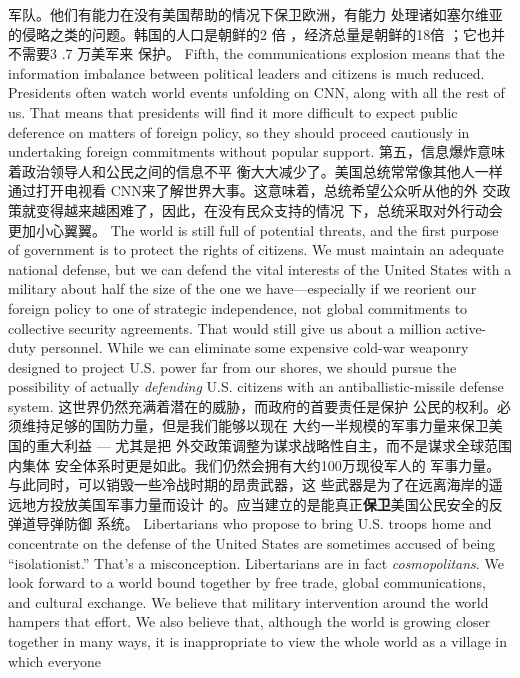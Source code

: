 \begin{paracol}{2}
军队。他们有能力在没有美国帮助的情况下保卫欧洲，有能力
处理诸如塞尔维亚的侵略之类的问题。韩国的人口是朝鲜的2
倍 ，经济总量是朝鲜的18倍 ；它也并不需要3 .7 万美军来
保护。
\switchcolumn*
Fifth, the communications explosion means that the information imbalance between political leaders and citizens is much
reduced. Presidents often watch world events unfolding on
CNN, along with all the rest of us. That means that presidents
will find it more difficult to expect public deference on matters of foreign policy, so they should proceed cautiously in undertaking foreign commitments without popular support.
\switchcolumn
第五，信息爆炸意味着政治领导人和公民之间的信息不平
衡大大减少了。美国总统常常像其他人一样通过打开电视看
CNN来了解世界大事。这意味着，总统希望公众听从他的外
交政策就变得越来越困难了，因此，在没有民众支持的情况
下，总统采取对外行动会更加小心翼翼。
\switchcolumn*
The world is still full of potential threats, and the first purpose of government is to protect the rights of citizens. We must
maintain an adequate national defense, but we can defend the
vital interests of the United States with a military about half the
size of the one we have---especially if we reorient our foreign
policy to one of strategic independence, not global commitments to collective security agreements. That would still give
us about a million active-duty personnel. While we can eliminate some expensive cold-war weaponry designed to project
U.S. power far from our shores, we should pursue the possibility
of actually \textit{defending} U.S. citizens with an antiballistic-missile
defense system.
\switchcolumn
这世界仍然充满着潜在的威胁，而政府的首要责任是保护
公民的权利。必须维持足够的国防力量，但是我们能够以现在
大约一半规模的军事力量来保卫美国的重大利益 --- 尤其是把
外交政策调整为谋求战略性自主，而不是谋求全球范围内集体
安全体系时更是如此。我们仍然会拥有大约100万现役军人的
军事力量。与此同时，可以销毁一些冷战时期的昂贵武器，这
些武器是为了在远离海岸的遥远地方投放美国军事力量而设计
的。应当建立的是能真正\textbf{保卫}美国公民安全的反弹道导弹防御
系统。
\switchcolumn*
Libertarians who propose to bring U.S. troops home and concentrate on the defense of the United States are sometimes accused of being  ``isolationist.''  That's  a misconception.
Libertarians are in fact \textit{cosmopolitans}. We look forward to a world
bound together by free trade, global communications, and cultural exchange. We believe that military intervention around
the world hampers that effort. We also believe that, although
the world is growing closer together in many ways, it is inappropriate to view the whole world as a village in which everyone

\end{paracol}
